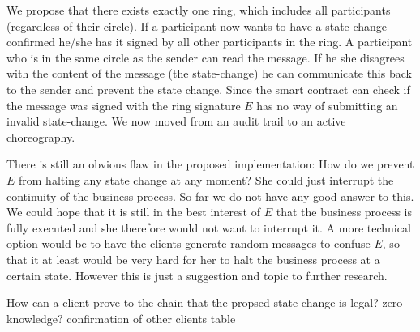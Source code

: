 \documentclass[runningheads]{llncs}
\begin{document}
We propose that there exists exactly one ring, which includes all participants (regardless of their circle). If a participant now wants to have a state-change confirmed he/she has it signed by all other participants in the ring. A participant who is in the same circle as the sender can read the message. If he she disagrees with the content of the message (the state-change) he can communicate this back to the sender and prevent the state change. Since the smart contract can check if the message was signed with the ring signature $E$ has no way of submitting an invalid state-change. We now moved from an audit trail to an active choreography. 

There is still an obvious flaw in the proposed implementation: How do we prevent $E$ from halting any state change at any moment? She could just interrupt the continuity of the business process. So far we do not have any good answer to this. We could hope that it is still in the best interest of $E$ that the business process is fully executed and she therefore would not want to interrupt it. A more technical option would be to have the clients generate random messages to confuse $E$, so that it at least would be very hard for her to halt the business process at a certain state. However this is just a suggestion and topic to further research.



How can a client prove to the chain that the propsed state-change is legal?
zero-knowledge?
confirmation of other clients
table
\end{document}
